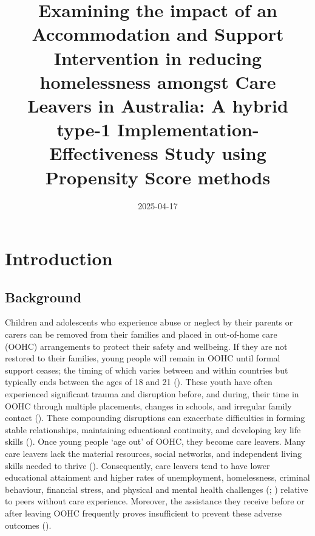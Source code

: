 \documentclass[
  jou,
  floatsintext,
  longtable,
  nolmodern,
  notxfonts,
  notimes,
  colorlinks=true,linkcolor=blue,citecolor=blue,urlcolor=blue]{apa7}
\title{Examining the impact of an Accommodation and Support Intervention
in reducing homelessness amongst Care Leavers in Australia: A hybrid
type-1 Implementation-Effectiveness Study using Propensity Score
methods}
\date{2025-04-17}
\begin{document}
\maketitle


\setcounter{secnumdepth}{-\maxdimen} %

\setlength\LTleft{0pt}


\section{Introduction}\label{introduction}

\subsection{Background}\label{background}

Children and adolescents who experience abuse or neglect by their
parents or carers can be removed from their families and placed in
out-of-home care (OOHC) arrangements to protect their safety and
wellbeing. If they are not restored to their families, young people will
remain in OOHC until formal support ceases; the timing of which varies
between and within countries but typically ends between the ages of 18
and 21
(). These youth have often
experienced significant trauma and disruption before, and during, their
time in OOHC through multiple placements, changes in schools, and
irregular family contact
(). These compounding disruptions can exacerbate
difficulties in forming stable relationships, maintaining educational
continuity, and developing key life skills
(). Once young people `age out' of OOHC, they become care leavers.
Many care leavers lack the material resources, social networks, and
independent living skills needed to thrive
(). Consequently, care leavers tend to have lower educational
attainment and higher rates of unemployment, homelessness, criminal
behaviour, financial stress, and physical and mental health challenges
(;
) relative to peers
without care experience. Moreover, the assistance they receive before or
after leaving OOHC frequently proves insufficient to prevent these
adverse outcomes
().
\end{document}
